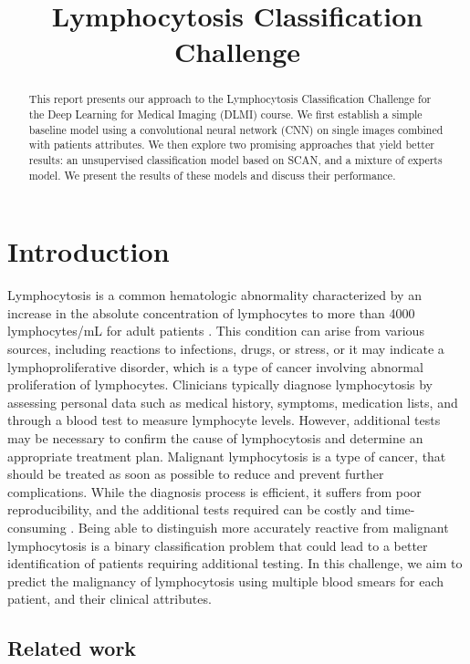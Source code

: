 \documentclass{midl}
\title[DLMI]{Lymphocytosis Classification Challenge}
\begin{document}
\maketitle

\begin{abstract}
    This report presents our approach to the Lymphocytosis Classification Challenge for the Deep Learning for Medical Imaging (DLMI) course. We first establish a simple baseline model using a convolutional neural network (CNN) on single images combined with patients attributes. We then explore two promising approaches that yield better results: an unsupervised classification model based on SCAN, and a mixture of experts model. We present the results of these models and discuss their performance.
\end{abstract}

\section{Introduction}
\label{sec:introduction}
Lymphocytosis is a common hematologic abnormality characterized by an increase in the absolute concentration of lymphocytes to more than 4000 lymphocytes/mL for adult patients \cite{Hamad_2023}. This condition can arise from various sources, including reactions to infections, drugs, or stress, or it may indicate a lymphoproliferative disorder, which is a type of cancer involving abnormal proliferation of lymphocytes. Clinicians typically diagnose lymphocytosis by assessing personal data such as medical history, symptoms, medication lists, and through a blood test to measure lymphocyte levels. However, additional tests may be necessary to confirm the cause of lymphocytosis and determine an appropriate treatment plan. Malignant lymphocytosis is a type of cancer, that should be treated as soon as possible to reduce and prevent further complications. While the diagnosis process is efficient, it suffers from poor reproducibility, and the additional tests required can be costly and time-consuming \cite{Sahasrabudhe_2021}. Being able to distinguish more accurately reactive from malignant lymphocytosis is a binary classification problem that could lead to a better identification of patients requiring additional testing. In this challenge, we aim to predict the malignancy of lymphocytosis using multiple blood smears for each patient, and their clinical attributes.

\subsection{Related work}
\end{document}
